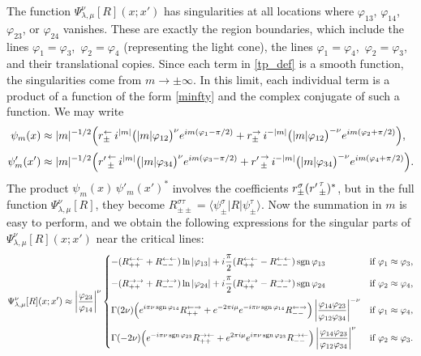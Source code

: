 \documentclass[12pt]{article}
\newcommand*{\bra}[1]{\langle{#1}|}
\newcommand*{\ket}[1]{|{#1}\rangle}
\newcommand{\vp}{\varphi}
\DeclareMathOperator{\sgn}{sgn}
\newcommand{\lar}{{\leftarrow}}
\newcommand{\rar}{{\rightarrow}}
\begin{document}
The function $\Psi^{\nu}_{\lambda,\mu}[R](x;x')$ has singularities at all locations where $\vp_{13}$, $\vp_{14}$, $\vp_{23}$, or $\vp_{24}$ vanishes. These are exactly the region boundaries, which include the lines $\vp_1=\vp_3$,\, $\vp_2=\vp_4$ (representing the light cone), the lines $\vp_1=\vp_4$,\, $\vp_2=\vp_3$, and their translational copies. Since each term in \eqref{tp_def} is a smooth function, the singularities come from $m\to\pm\infty$. In this limit, each individual term is a product of a function of the form \eqref{minfty} and the complex conjugate of such a function. We may write
\begin{equation}\label{psip1}
\begin{aligned}
\psi_m(x)
&\approx |m|^{-1/2}\Bigl(
r^{\lar}_{\pm}\,i^{|m|}
\bigl(|m|\vp_{12}\bigr)^{\nu}e^{im(\vp_1-\pi/2)}
+r^{\rar}_{\pm}\,i^{-|m|}
\bigl(|m|\vp_{12}\bigr)^{-\nu}e^{im(\vp_2+\pi/2)}
\Bigr),\\[2pt]
\psi'_m(x')
&\approx |m|^{-1/2}\Bigl(
{r'\kern1pt}^{\lar}_{\pm}\,i^{|m|}
\bigl(|m|\vp_{34}\bigr)^{\nu}e^{im(\vp_3-\pi/2)}
+{r'\kern1pt}^{\rar}_{\pm}\,i^{-|m|}
\bigl(|m|\vp_{34}\bigr)^{-\nu}e^{im(\vp_4+\pi/2)}
\Bigr).
\end{aligned}
\end{equation}
The product $\psi_m(x)\,\psi'_m(x')^*$ involves the coefficients $r^{\sigma}_{\pm}({r'\kern1pt}^{\tau}_{\pm})^*$, but in the full function $\Psi^{\nu}_{\lambda,\mu}[R]$, they become $R^{\sigma\tau}_{\pm\pm} =\bra{\psi^{\sigma}_{\pm}}R \ket{\psi^{\tau}_{\pm}}$. Now the summation in $m$ is easy to perform, and we obtain the following expressions for the singular parts of $\Psi^{\nu}_{\lambda,\mu}[R](x;x')$ near the critical lines:
\begin{equation}\label{asymp_sing}
\Psi^{\nu}_{\lambda,\mu}[R](x;x')\approx \left|\frac{\vp_{23}}{\vp_{14}}\right|^{\nu}
\begin{dcases}
-(R^{\lar\lar}_{++}+R^{\lar\lar}_{--})\ln|\vp_{13}|
+i\frac{\pi}{2}(R^{\lar\lar}_{++}-R^{\lar\lar}_{--})\sgn\vp_{13}
&\text{if } \vp_1\approx\vp_3,
\\[2pt]
-(R^{\rar\rar}_{++}+R^{\rar\rar}_{--})\ln|\vp_{24}|
+i\frac{\pi}{2}(R^{\rar\rar}_{++}-R^{\rar\rar}_{--})\sgn\vp_{24}
&\text{if } \vp_2\approx\vp_4,
\\[2pt]
\Gamma(2\nu)\Bigl(e^{i\pi\nu\sgn\vp_{14}}R^{\lar\rar}_{++}
+e^{-2\pi i\mu}e^{-i\pi\nu\sgn\vp_{14}}R^{\lar\rar}_{--}\Bigr)
\left|\frac{\vp_{14}\vp_{23}}{\vp_{12}\vp_{34}}\right|^{-\nu}
&\text{if } \vp_1\approx\vp_4,
\\[2pt]
\Gamma(-2\nu)\Bigl(e^{-i\pi\nu\sgn\vp_{23}}R^{\rar\lar}_{++}
+e^{2\pi i\mu}e^{i\pi\nu\sgn\vp_{23}}R^{\rar\lar}_{--}\Bigr)
\left|\frac{\vp_{14}\vp_{23}}{\vp_{12}\vp_{34}}\right|^{\nu}
&\text{if } \vp_2\approx\vp_3.
\end{dcases}
\end{equation}
\end{document}
